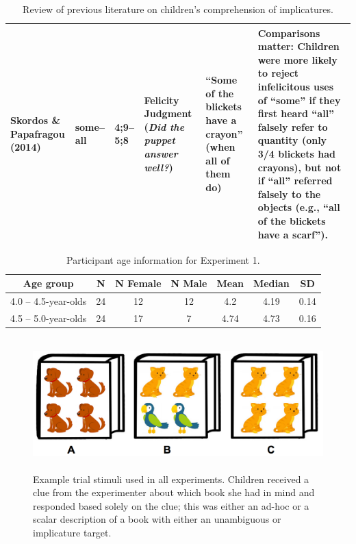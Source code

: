 \documentclass[man]{apa2}
\begin{document}
{\begin{landscape}
\begin{table}[!ht]
\begin{tabular}{| p{2.2cm} | p{2cm} | p{1.69cm} | p{4.5cm} | p{5cm} | p{7.2cm} |}
\parbox[t]{2.2cm}{Skordos \&\\Papafragou (2014)} & some--all & 4;9--5;8 & Felicity Judgment (\textit{Did the puppet answer well?}) & ``Some of the blickets have a crayon'' (when all of them do)  & Comparisons matter: Children were more likely to reject infelicitous uses of ``some'' if they first heard ``all'' falsely refer to quantity (only 3/4 blickets had crayons), but not if ``all'' referred falsely to the objects (e.g., ``all of the blickets have a scarf'').\\ \hline \end{tabular}
\caption{\label{tab:lit_review}Review of previous literature on children's comprehension of implicatures.}
\end{table}
\end{landscape}
\restoregeometry

\newpage

\begin{table}[tb]
\centering
\begin{tabular}{ccccccc}
\hline
{\bf Age group} & {\bf N} & {\bf N Female} & {\bf N Male} & {\bf Mean} & {\bf Median} & {\bf SD} \\
\hline
4.0 -- 4.5-year-olds & 24 & 12 & 12 & 4.2 & 4.19 & 0.14 \\
4.5 -- 5.0-year-olds & 24 & 17 & 7 & 4.74 & 4.73 & 0.16\\
\hline
\end{tabular}
\caption{\label{tab:exp_1_demo}Participant age information for Experiment 1.}
\end{table}

\newpage

\begin{figure}
 \begin{center}
  \includegraphics[height=2in]{figures/implicatures_demo_letters.png}
  \caption{\label{fig:demo} Example trial stimuli used in all experiments. Children received a clue from the experimenter about which book she had in mind and responded based solely on the clue; this was either an ad-hoc or a scalar description of a book with either an unambiguous or implicature target.}
 \end{center}
\end{figure}

}
\end{document}
